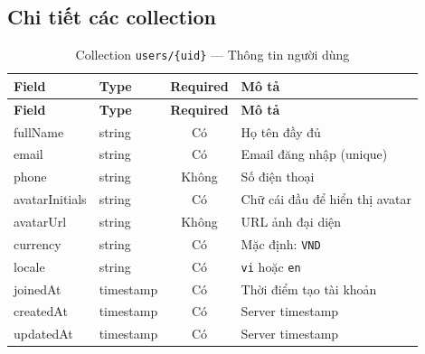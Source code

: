 \subsection{Chi tiết các collection}

\begin{longtable}{|l|l|c|p{6cm}|}
\caption{Collection \texttt{users/\{uid\}} --- Thông tin người dùng} \\
\hline
\textbf{Field} & \textbf{Type} & \textbf{Required} & \textbf{Mô tả} \\
\hline
\endfirsthead
\hline
\textbf{Field} & \textbf{Type} & \textbf{Required} & \textbf{Mô tả} \\
\hline
\endhead
fullName & string & Có & Họ tên đầy đủ \\
\hline
email & string & Có & Email đăng nhập (unique) \\
\hline
phone & string & Không & Số điện thoại \\
\hline
avatarInitials & string & Có & Chữ cái đầu để hiển thị avatar \\
\hline
avatarUrl & string & Không & URL ảnh đại diện \\
\hline
currency & string & Có & Mặc định: \texttt{VND} \\
\hline
locale & string & Có & \texttt{vi} hoặc \texttt{en} \\
\hline
joinedAt & timestamp & Có & Thời điểm tạo tài khoản \\
\hline
createdAt & timestamp & Có & Server timestamp \\
\hline
updatedAt & timestamp & Có & Server timestamp \\
\hline
\end{longtable}

